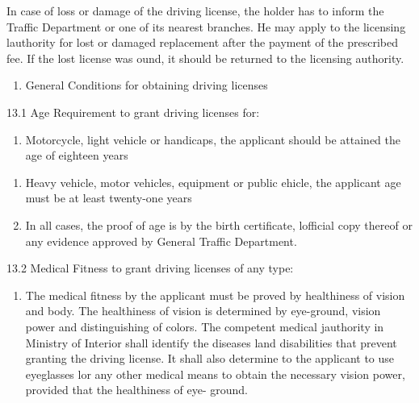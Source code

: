 \documentclass{book}
\begin{document}
In case of loss or damage of the driving license, the holder has to
inform the Traffic Department or one of its\textbar{} nearest branches.
He may apply to the licensing lauthority for lost or damaged replacement
after the payment of the prescribed fee. If the lost license was ound,
it should be returned to the licensing authority.

\begin{enumerate}
	\def\labelenumi{\arabic{enumi}.}
	\setcounter{enumi}{12}
	\tightlist
	\item
	      General Conditions for obtaining driving licenses
\end{enumerate}

13.1 Age Requirement to grant driving licenses for:

\begin{enumerate}
	\def\labelenumi{\roman{enumi}.}
	\tightlist
	\item
	      Motorcycle, light vehicle or handicaps, the applicant should be
	      attained the age of eighteen years
\end{enumerate}

\begin{enumerate}
	\def\labelenumi{\arabic{enumi}.}
	\setcounter{enumi}{1}
	\item
	      Heavy vehicle, motor vehicles, equipment or public ehicle, the
	      applicant age must be at least twenty-one years
	\item
	      In all cases, the proof of age is by the birth certificate, lofficial
	      copy thereof or any evidence approved by General Traffic Department.
\end{enumerate}

13.2 Medical Fitness to grant driving licenses of any type:

\begin{enumerate}
	\def\labelenumi{\roman{enumi}.}
	\tightlist
	\item
	      The medical fitness by the applicant must be proved by\textbar{}
	      healthiness of vision and body. The healthiness of vision is
	      determined by eye-ground, vision power and distinguishing of colors.
	      The competent medical jauthority in Ministry of Interior shall
	      identify the diseases land disabilities that prevent granting the
	      driving license. It shall also determine to the applicant to use
	      eyeglasses lor any other medical means to obtain the necessary vision
	      power, provided that the healthiness of eye- ground.
\end{enumerate}
\end{document}
